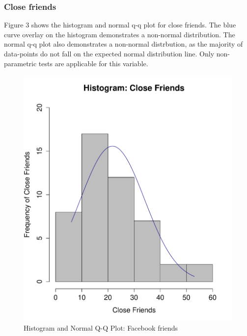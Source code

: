 \subsubsection{Close friends}

Figure 3 shows the histogram and normal q-q plot for close friends. The blue curve overlay on the histogram demonstrates a non-normal distribution. The normal q-q plot also demonstrates a non-normal distrbution, as the majority of data-points do not fall on the expected normal distribution line. Only non-parametric tests are applicable for this variable.

\begin{figure}[H]
\caption{Histogram and Normal Q-Q Plot: Facebook friends}
\centering
\includegraphics[scale=0.35]{./img/hist_closefriends.pdf}

\end{figure}
